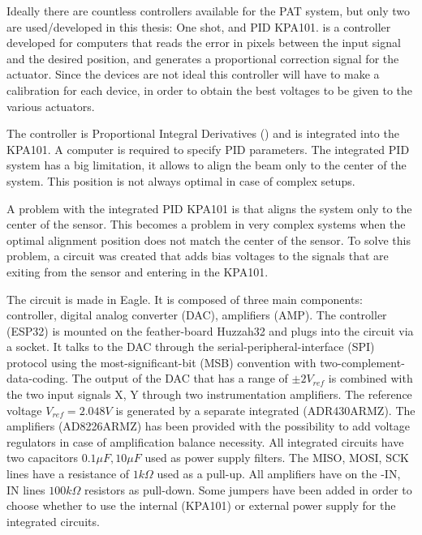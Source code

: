 Ideally there are countless controllers available for the PAT system, but only two are used/developed in this thesis: One shot, and PID KPA101.
 is a controller developed for computers that reads the error in pixels between the input signal and the desired position, and generates a proportional correction signal for the actuator.
Since the devices are not ideal this controller will have to make a calibration for each device, in order to obtain the best voltages to be given to the various actuators.

The  controller is Proportional Integral Derivatives () and is integrated into the KPA101. A computer is required to specify PID parameters. The integrated PID system has a big limitation, it allows to align the beam only to the center of the system. This position is not always optimal in case of complex setups.

A problem with the integrated PID KPA101 is that aligns the system only to the center of the sensor. This becomes a problem in very complex systems when the optimal alignment position does not match the center of the sensor.
To solve this problem, a circuit was created that adds bias voltages to the signals that are exiting from the sensor and entering in the KPA101.

The circuit is made in Eagle. It is composed of three main components: controller, digital analog converter (DAC), amplifiers (AMP).
The controller (ESP32) is mounted on the feather-board Huzzah32 and plugs into the circuit via a socket. It talks to the DAC through the serial-peripheral-interface (SPI) protocol using the most-significant-bit (MSB) convention with two-complement-data-coding.
The output of the DAC that has a range of $\pm 2 V_{ref}$ is combined with the two input signals X, Y through two instrumentation amplifiers. The reference voltage $V_{ref} = 2.048V$ is generated by a separate integrated (ADR430ARMZ).
The amplifiers (AD8226ARMZ) has been provided with the possibility to add voltage regulators in case of amplification balance necessity.
All integrated circuits have two capacitors $0.1 \mu F, 10 \mu F$ used as power supply filters. The MISO, MOSI, SCK lines have a resistance of $1 k \Omega$ used as a pull-up.
All amplifiers have on the -IN, IN lines $100 k \Omega$ resistors as pull-down. Some jumpers have been added in order to choose whether to use the internal (KPA101) or external power supply for the integrated circuits.

